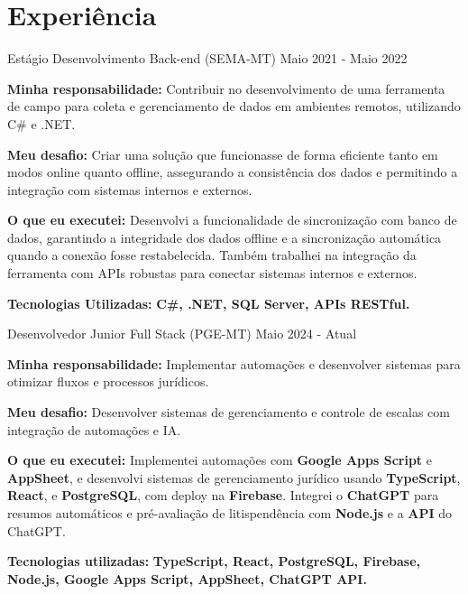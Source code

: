 \section{\textbf{Experiência}}
  \resumeSubHeadingListStart
    \resumeSubheading
      { Estágio Desenvolvimento Back-end (SEMA-MT)}{}
      {}{Maio 2021 - Maio 2022}
      \vspace{-2.0mm}
        \resumeItemListStart  
          \item \textbf{Minha responsabilidade:} Contribuir no desenvolvimento de uma ferramenta de campo para coleta e gerenciamento de dados em ambientes remotos, utilizando C\# e .NET.  
          \item \textbf{Meu desafio:} Criar uma solução que funcionasse de forma eficiente tanto em modos online quanto offline, assegurando a consistência dos dados e permitindo a integração com sistemas internos e externos.  
          \item \textbf{O que eu executei:} Desenvolvi a funcionalidade de sincronização com banco de dados, garantindo a integridade dos dados offline e a sincronização automática quando a conexão fosse restabelecida. Também trabalhei na integração da ferramenta com APIs robustas para conectar sistemas internos e externos.  
          \item \textbf{Tecnologias Utilizadas:} \textbf{C\#, .NET, SQL Server, APIs RESTful.  }
        \resumeItemListEnd  
        

    \vspace{-2mm}
    
        \resumeSubheading
      { Desenvolvedor Junior Full Stack (PGE-MT)}{}
      {}{Maio 2024 - Atual}
      \vspace{-2.0mm}
    \resumeItemListStart
      \item \textbf{Minha responsabilidade:} Implementar automações e desenvolver sistemas para otimizar fluxos e processos jurídicos.
      \item \textbf{Meu desafio:} Desenvolver sistemas de gerenciamento e controle de escalas com integração de automações e IA.
      \item \textbf{O que eu executei:} Implementei automações com \textbf{Google Apps Script} e \textbf{AppSheet}, e desenvolvi sistemas de gerenciamento jurídico usando \textbf{TypeScript}, \textbf{React}, e \textbf{PostgreSQL}, com deploy na \textbf{Firebase}. Integrei o \textbf{ChatGPT} para resumos automáticos e pré-avaliação de litispendência com \textbf{Node.js} e a \textbf{API} do ChatGPT.
      \item \textbf{Tecnologias utilizadas:} \textbf{TypeScript, React, PostgreSQL, Firebase, Node.js, Google Apps Script, AppSheet, ChatGPT API.}
    \resumeItemListEnd
    


